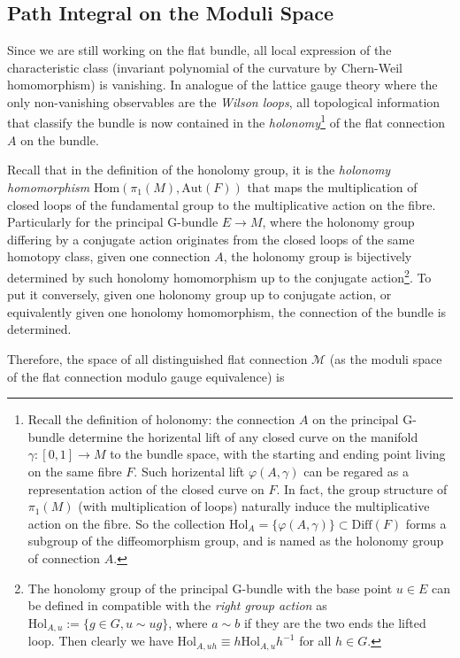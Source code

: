 \documentclass[10pt,nofootinbib,letterpaper]{revtex4}
\begin{document}
	\subsection{Path Integral on the Moduli Space}
		Since we are still working on the flat bundle, all local expression of the characteristic class (invariant polynomial of the curvature by Chern-Weil homomorphism) is vanishing. In analogue of the lattice gauge theory where the only non-vanishing observables are the \emph{Wilson loops}, {\color{red}all topological information that classify the bundle is now contained in the \emph{holonomy}\footnote{Recall the definition of holonomy: the connection $A$ on the principal G-bundle determine the horizental lift of any closed curve on the manifold $\gamma:[0,1]\rightarrow M$ to the bundle space, with the starting and ending point living on the same fibre $F$. Such horizental lift $\varphi(A,\gamma)$ can be regared as a representation action of the closed curve on $F$. In fact, the group structure of $\pi_1(M)$ (with multiplication of loops) naturally induce the multiplicative action on the fibre. So the collection $\mathrm{Hol}_A=\{\varphi(A,\gamma)\}\subset\mathrm{Diff}(F)$ forms a subgroup of the diffeomorphism group, and is named as the holonomy group of connection $A$.} of the flat connection $A$ on the bundle}.\par
		Recall that in the definition of the honolomy group, it is the \emph{holonomy homomorphism} $\mathrm{Hom}(\pi_1(M),\mathrm{Aut}(F))$ that maps the multiplication of closed loops of the fundamental group to the multiplicative action on the fibre. Particularly for the principal G-bundle $E\rightarrow M$, where the holonomy group differing by a conjugate action originates from the closed loops of the same homotopy class, {\color{red}given one connection $A$, the holonomy group is bijectively determined by such honolomy homomorphism up to the conjugate action}\footnote{The honolomy group of the principal G-bundle with the base point $u\in E$ can be defined in compatible with the \emph{right group action} as $\mathrm{Hol}_{A,u}:=\{g\in G,u\sim ug\}$, where $a\sim b$ if they are the two ends the lifted loop. Then clearly we have $\mathrm{Hol}_{A,uh}\equiv h\mathrm{Hol}_{A,u}h^{-1}$ for all $h\in G$.}. To put it conversely, {\color{red}given one holonomy group up to conjugate action, or equivalently given one honolomy homomorphism, the connection of the bundle is determined}.\par
		Therefore, the space of all distinguished flat connection $\mathcal{M}$ (as the moduli space of the flat connection modulo gauge equivalence) is \cite{atiyah1983yang}
\end{document}
